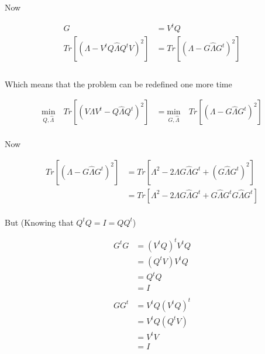 \documentclass{article}
\begin{document}
    Now

    \begin{equation*}
        \begin{aligned}
            G &= V^tQ\\
            Tr[(\Lambda - V^tQ \hat{\Lambda} Q^tV)^2] &= Tr[(\Lambda - G \hat{\Lambda} G^t)^2]\\
        \end{aligned}
    \end{equation*}\\

    Which means that the problem can be redefined one more time

    \begin{equation*}
        \begin{aligned}
        \underset{Q,\hat{\Lambda}}{\text{min}} \quad Tr[(V\Lambda V^t - Q \hat{\Lambda} Q^t)^2]
        &=
        \underset{G,\hat{\Lambda}}{\text{min}} \quad Tr[(\Lambda - G \hat{\Lambda} G^t)^2]
        \end{aligned}
    \end{equation*}\\

    Now

    \begin{equation*}
        \begin{aligned}
        Tr[(\Lambda - G \hat{\Lambda} G^t)^2]
        &=
        Tr[\Lambda^2 - 2 \Lambda G \hat{\Lambda} G^t + (G \hat{\Lambda} G^t)^2]\\
        &=
        Tr[\Lambda^2 - 2 \Lambda G \hat{\Lambda} G^t + G \hat{\Lambda} G^t G \hat{\Lambda} G^t]\\
        \end{aligned}
    \end{equation*}

    But (Knowing that $Q^tQ = I = QQ^t$)

    \begin{equation*}
        \begin{aligned}
            G^tG &= (V^tQ)^t V^tQ\\
                 &= (Q^tV) V^tQ\\
                 &= Q^tQ\\
                 &= I\\ \\
            GG^t &= V^tQ (V^tQ)^t\\
                 &= V^tQ (Q^tV)\\
                 &= V^tV\\
                 &= I\\ \\
        \end{aligned}
    \end{equation*}
\end{document}
